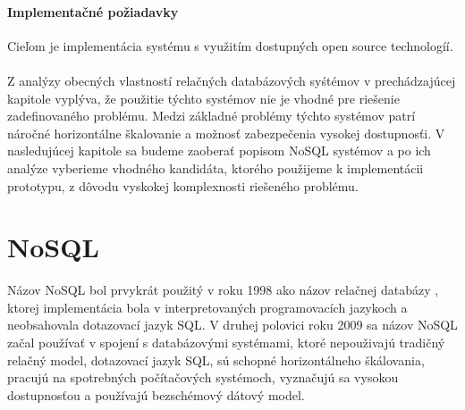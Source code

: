 \documentclass[11pt,twoside,a4paper]{book}
\begin{document}
\subsubsection*{Implementačné požiadavky}
Cieľom je implementácia systému s využitím dostupných open source technologíí. 

\subsubsection*{}
Z analýzy obecných vlastností relačných databázových syśtémov v prechádzajúcej kapitole vyplýva, že použitie týchto systémov nie je vhodné pre riešenie zadefinovaného problému. Medzi základné problémy týchto systémov patrí náročné horizontálne škalovanie a možnosť zabezpečenia vysokej dostupnosťi. V nasledujúcej kapitole sa budeme zaoberať popisom NoSQL systémov a po ich analýze vyberieme vhodného kandidáta, ktorého použijeme k implementácii prototypu, z dôvodu vyskokej komplexnosti riešeného problému.





\chapter{NoSQL}
\label{chapter:NoSQL}
Názov NoSQL bol prvykrát použitý v roku 1998 ako názov relačnej databázy \cite{strozziNosql}, ktorej implementácia bola v interpretovaných programovacích jazykoch a neobsahovala dotazovací jazyk SQL. V druhej polovici roku 2009 sa názov NoSQL začal používať v spojení s databázovými systémami, ktoré nepouživajú tradičný relačný model, dotazovací jazyk SQL, sú schopné horizontálneho škálovania, pracujú na spotrebných počítačových systémoch, vyznačujú sa vysokou dostupnosťou a používajú bezschémový dátový model.
\end{document}
